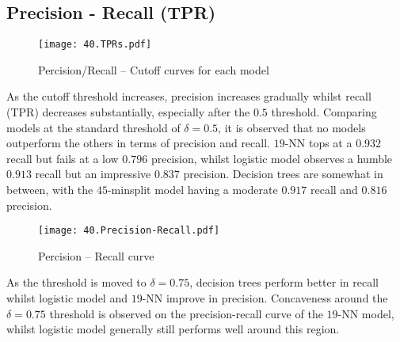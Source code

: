 

\subsection{Precision - Recall (TPR)}
\begin{figure}[H]
    \texttt{[image: 40.TPRs.pdf]}
    \caption{\centering Percision/Recall -- Cutoff curves for each model}
\end{figure}

As the cutoff threshold increases, precision increases gradually whilst recall (TPR) decreases substantially, especially after the \( 0.5 \) threshold. Comparing models at the standard threshold of \( \delta = 0.5 \), it is observed that no models outperform the others in terms of precision and recall. \( 19 \)-NN tops at a \( 0.932 \) recall but fails at a low \( 0.796 \) precision, whilst logistic model observes a humble \( 0.913 \) recall but an impressive \( 0.837 \) precision. Decision trees are somewhat in between, with the \(45\)-minsplit model having a moderate \( 0.917 \) recall and \( 0.816 \) precision. 

\begin{figure}[h]
    \texttt{[image: 40.Precision-Recall.pdf]}
    \caption{\centering Percision -- Recall curve}
\end{figure}

As the threshold is moved to \( \delta = 0.75 \), decision trees perform better in recall whilst logistic model and \( 19 \)-NN improve in precision. Concaveness around the \( \delta = 0.75 \) threshold is observed on the precision-recall curve of the \( 19 \)-NN model, whilst logistic model generally still performs well around this region.

